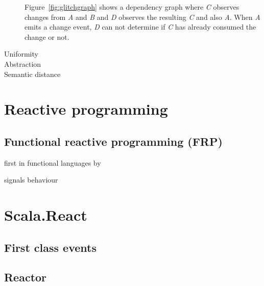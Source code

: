 \documentclass[format=acmtog]{acmart}
\begin{document}
\begin{description}
			Figure~\ref{fig:glitchgraph} shows a dependency graph where \textit{C} observes changes from \textit{A} and \textit{B} and \textit{D} observes the resulting \textit{C} and also \textit{A}.
			When \textit{A} emits a change event, \textit{D} can not determine if \textit{C} has already consumed the change or not. 
			
			\item[Uniformity]
			
			\item[Abstraction]
			
			\item[Semantic distance]
		\end{description}

\section{Reactive programming}

	\subsection{Functional reactive programming (FRP)}

		first in functional languages by~\cite{Elliott}

		signals behaviour~\cite{Bainomugisha:2013}
	

\section{Scala.React}

	\subsection{First class events}

	\subsection{Reactor}
\end{document}
